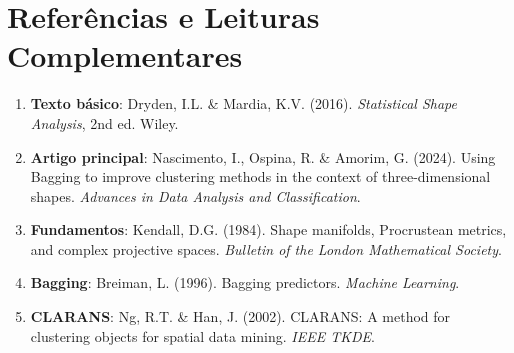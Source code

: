 \documentclass[12pt,a4paper]{article}
\theoremstyle{definition}
\begin{document}
\section{Referências e Leituras Complementares}

\begin{enumerate}
    \item \textbf{Texto básico}: Dryden, I.L.
\& Mardia, K.V.
(2016).
\textit{Statistical Shape Analysis}, 2nd ed.
Wiley.
    
    \item \textbf{Artigo principal}: Nascimento, I., Ospina, R.
\& Amorim, G.
(2024).
Using Bagging to improve clustering methods in the context of three-dimensional shapes.
\textit{Advances in Data Analysis and Classification}.
    
    \item \textbf{Fundamentos}: Kendall, D.G.
(1984).
Shape manifolds, Procrustean metrics, and complex projective spaces.
\textit{Bulletin of the London Mathematical Society}.
    
    \item \textbf{Bagging}: Breiman, L.
(1996).
Bagging predictors.
\textit{Machine Learning}.
    
    \item \textbf{CLARANS}: Ng, R.T.
\& Han, J.
(2002).
CLARANS: A method for clustering objects for spatial data mining.
\textit{IEEE TKDE}.
\end{enumerate}
\end{document}
